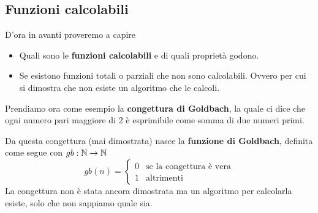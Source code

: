 \subsection{Funzioni calcolabili}
D'ora in avanti proveremo a capire
\begin{itemize}
	\item Quali sono le \textbf{funzioni calcolabili} e di
	      quali proprietà godono.
	\item Se esistono funzioni totali o parziali che non sono
	      calcolabili. Ovvero per cui si dimostra che non esiste
	      un algoritmo che le calcoli.
\end{itemize}

\begin{example}
	Prendiamo ora come esempio la
	\textbf{congettura di Goldbach}, la quale ci dice che ogni
	numero pari maggiore di 2 è esprimibile come somma di due
	numeri primi.

	Da questa congettura (mai dimostrata) nasce la
	\textbf{funzione di Goldbach}, definita come segue con
	$gb : \mathbb{N} \to \mathbb{N}$
	\[
		gb(n) = \begin{cases}
			0 & \text{se la congettura è vera} \\
			1 & \text{altrimenti}
		\end{cases}
	\]
	La congettura non è stata ancora dimostrata ma un algoritmo
	per calcolarla esiste, solo che non sappiamo quale sia.
\end{example}

